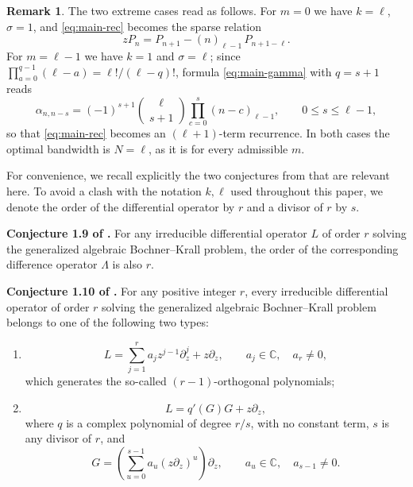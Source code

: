 \documentclass{amsart}
\theoremstyle{definition}
\newtheorem{remark}[theorem]{Remark}
\newcommand{\C}{\mathbb C}
\newcommand{\fall}[2]{(#1)_{#2}}
\begin{document}
\begin{remark}
The two extreme cases read as follows.  For \(m=0\) we have \(k=\ell\),
\(\sigma=1\), and \eqref{eq:main-rec} becomes the sparse relation
\[
zP_n=P_{n+1}-\fall{n}{\ell-1}\,P_{n+1-\ell}.
\]
For \(m=\ell-1\) we have \(k=1\) and \(\sigma=\ell\); since
\(\prod_{a=0}^{q-1}(\ell-a)=\ell!/(\ell-q)!\), formula
\eqref{eq:main-gamma} with \(q=s+1\) reads
\[
\alpha_{n,n-s}
=(-1)^{s+1}\binom{\ell}{s+1}\prod_{c=0}^{s}\fall{n-c}{\ell-1},
\qquad 0\le s\le\ell-1,
\]
so that \eqref{eq:main-rec} becomes an \((\ell+1)\)-term recurrence.  In both
cases the optimal bandwidth is \(N=\ell\), as it is for every admissible
\(m\).
\end{remark}

For convenience, we recall explicitly the two conjectures from
\cite{HoShTa} that are relevant here.  To avoid a clash with the notation
\(k,\ell\) used throughout this paper, we denote the order of the
differential operator by \(r\) and a divisor of \(r\) by \(s\).

\medskip\noindent
\textbf{Conjecture 1.9 of \cite{HoShTa}.}
For any irreducible differential operator \(L\) of order \(r\) solving the
generalized algebraic Bochner--Krall problem, the order of the corresponding
difference operator \(\Lambda\) is also \(r\).

\medskip\noindent
\textbf{Conjecture 1.10 of \cite{HoShTa}.}
For any positive integer \(r\), every irreducible differential operator of
order \(r\) solving the generalized algebraic Bochner--Krall problem belongs
to one of the following two types:
\begin{enumerate}
\item
\[
L=\sum_{j=1}^{r} a_j z^{j-1}\partial_z^j+z\partial_z,
\qquad a_j\in\C,\quad a_r\ne0,
\]
which generates the so-called \((r-1)\)-orthogonal polynomials;
\item
\[
L=q'(G)G+z\partial_z,
\]
where \(q\) is a complex polynomial of degree \(r/s\), with no constant
term, \(s\) is any divisor of \(r\), and
\[
G=\left(\sum_{u=0}^{s-1}a_u(z\partial_z)^u\right)\partial_z,
\qquad a_u\in\C,\quad a_{s-1}\ne0.
\]
\end{enumerate}
\end{document}
